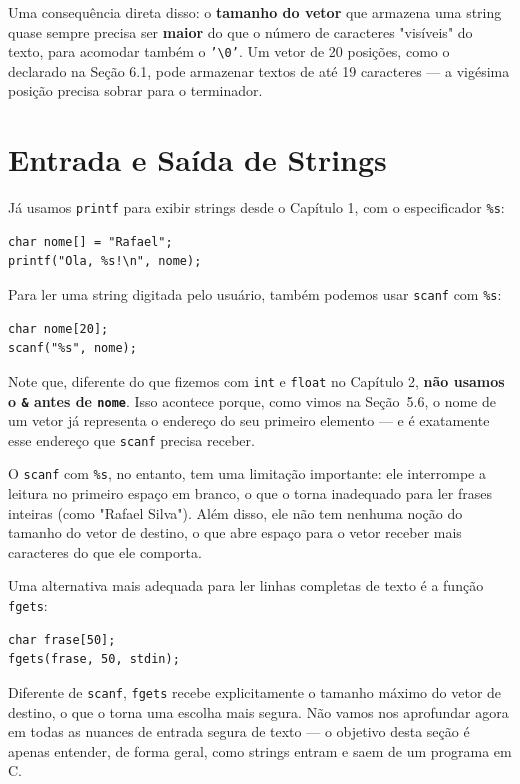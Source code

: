 \documentclass[12pt,a4paper,oneside]{extreport}
\begin{document}
Uma consequência direta disso: o \textbf{tamanho do vetor} que armazena uma string quase sempre precisa ser \textbf{maior} do que o número de caracteres "visíveis" do texto, para acomodar também o \texttt{'\textbackslash 0'}. Um vetor de 20 posições, como o declarado na Seção 6.1, pode armazenar textos de até 19 caracteres — a vigésima posição precisa sobrar para o terminador.

\section{Entrada e Saída de Strings}

Já usamos \texttt{printf} para exibir strings desde o Capítulo 1, com o especificador \texttt{\%s}:

\begin{lstlisting}
char nome[] = "Rafael";
printf("Ola, %s!\n", nome);
\end{lstlisting}

Para ler uma string digitada pelo usuário, também podemos usar \texttt{scanf} com \texttt{\%s}:

\begin{lstlisting}
char nome[20];
scanf("%s", nome);
\end{lstlisting}

Note que, diferente do que fizemos com \texttt{int} e \texttt{float} no Capítulo 2, \textbf{não usamos o \texttt{\&} antes de \texttt{nome}}. Isso acontece porque, como vimos na Seção~5.6, o nome de um vetor já representa o endereço do seu primeiro elemento — e é exatamente esse endereço que \texttt{scanf} precisa receber.

O \texttt{scanf} com \texttt{\%s}, no entanto, tem uma limitação importante: ele interrompe a leitura no primeiro espaço em branco, o que o torna inadequado para ler frases inteiras (como "Rafael Silva"). Além disso, ele não tem nenhuma noção do tamanho do vetor de destino, o que abre espaço para o vetor receber mais caracteres do que ele comporta.

Uma alternativa mais adequada para ler linhas completas de texto é a função \texttt{fgets}:

\begin{lstlisting}
char frase[50];
fgets(frase, 50, stdin);
\end{lstlisting}

Diferente de \texttt{scanf}, \texttt{fgets} recebe explicitamente o tamanho máximo do vetor de destino, o que o torna uma escolha mais segura. Não vamos nos aprofundar agora em todas as nuances de entrada segura de texto — o objetivo desta seção é apenas entender, de forma geral, como strings entram e saem de um programa em C.
\end{document}
